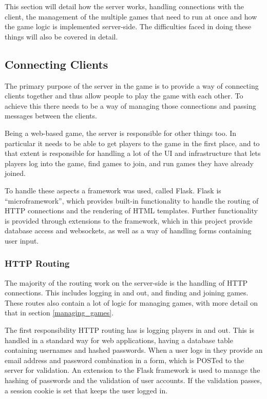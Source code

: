 This section will detail how the server works, handling connections with the client, the management of the multiple games that need to run at once and how the game logic is implemented server-side. The difficulties faced in doing these things will also be covered in detail.

\subsection{Connecting Clients}
The primary purpose of the server in the game is to provide a way of connecting clients together and thus allow people to play the game with each other. To achieve this there needs to be a way of managing those connections and passing messages between the clients.

Being a web-based game, the server is responsible for other things too. In particular it needs to be able to get players to the game in the first place, and to that extent is responsible for handling a lot of the UI and infrastructure that lets players log into the game, find games to join, and run games they have already joined.

To handle these aspects a framework was used, called Flask. Flask is ``microframework'', which provides built-in functionality to handle the routing of HTTP connections and the rendering of HTML templates. Further functionality is provided through extensions to the framework, which in this project provide database access and websockets, as well as a way of handling forms containing user input.

\subsubsection{HTTP Routing}
The majority of the routing work on the server-side is the handling of HTTP connections. This includes logging in and out, and finding and joining games. These routes also contain a lot of logic for managing games, with more detail on that in section \ref{managing_games}.

The first responsibility HTTP routing has is logging players in and out. This is handled in a standard way for web applications, having a database table containing usernames and hashed passwords. When a user logs in they provide an email address and password combination in a form, which is POSTed to the server for validation. An extension to the Flask framework is used to manage the hashing of passwords and the validation of user accounts. If the validation passes, a session cookie is set that keeps the user logged in.

